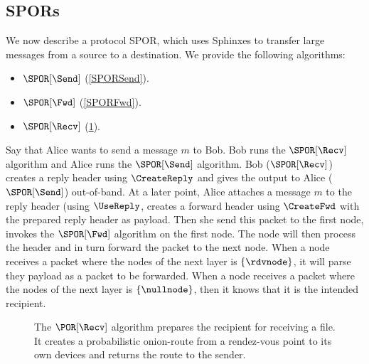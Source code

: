 
\subsection{\Acfp*{SPOR}}%
\label{sec:message_passing}


We now describe a protocol \ac{SPOR}, which uses Sphinxes to transfer large 
messages from a source to a destination.
We provide the following algorithms:
\begin{itemize}
  \item \(\SPOR[\Send]\) (\cref{SPORSend}).
  \item \(\SPOR[\Fwd]\) (\cref{SPORFwd}).
  \item \(\SPOR[\Recv]\) (\cref{SPORRecv}).
\end{itemize}

Say that Alice wants to send a message \(m\) to Bob.
Bob runs the \(\SPOR[\Recv]\) algorithm and Alice runs the \(\SPOR[\Send]\) 
algorithm.
Bob (\ie \(\SPOR[\Recv]\)) creates a reply header using \(\CreateReply\) and 
gives the output to Alice (\ie \(\SPOR[\Send]\)) out-of-band.
At a later point, Alice attaches a message \(m\) to the reply header (using 
\(\UseReply\), creates a forward header using \(\CreateFwd\) with the prepared 
reply header as payload.
Then she send this packet to the first node, \ie invokes the \(\SPOR[\Fwd]\) 
algorithm on the first node.
The node will then process the header and in turn forward the packet to the 
next node.
When a node receives a packet where the nodes of the next layer is 
\(\{\rdvnode\}\), it will parse they payload as a packet to be forwarded.
When a node receives a packet where the nodes of the next layer is 
\(\{\nullnode\}\), then it knows that it is the intended recipient.


\begin{figure}
  \caption{\label{SPORRecv}%
    The \(\POR[\Recv]\) algorithm prepares the recipient for receiving a file.
    It creates a probabilistic onion-route from a rendez-vous point to its own 
    devices and returns the route to the sender.
  }
\end{figure}

